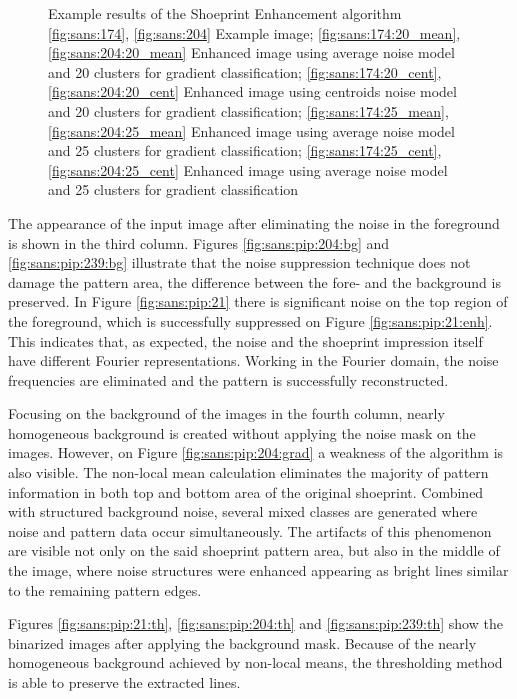 \documentclass[draft,final]{vutinfth} %
\begin{document}
{\begin{figure}[H]
\caption{Example results of the Shoeprint Enhancement algorithm
				\ref{fig:sans:174}, \ref{fig:sans:204} Example image; \ref{fig:sans:174:20_mean}, \ref{fig:sans:204:20_mean} Enhanced image using average noise model and 20 clusters for gradient classification; \ref{fig:sans:174:20_cent}, \ref{fig:sans:204:20_cent} Enhanced image using centroids noise model and 20 clusters for gradient classification; \ref{fig:sans:174:25_mean}, \ref{fig:sans:204:25_mean} Enhanced image using average noise model and 25 clusters for gradient classification; \ref{fig:sans:174:25_cent}, \ref{fig:sans:204:25_cent} Enhanced image using average noise model and 25 clusters for gradient classification}
\label{fig:sans:res2}

\end{figure}
}

\par
The appearance of the input image after eliminating the noise in the foreground is shown in the third column.
Figures  \ref{fig:sans:pip:204:bg} and \ref{fig:sans:pip:239:bg} illustrate that the noise suppression technique does not damage the pattern area, the difference between the fore- and the background is preserved.
In Figure \ref{fig:sans:pip:21} there is significant noise on the top region of the foreground, which is successfully suppressed on Figure \ref{fig:sans:pip:21:enh}.
This indicates that, as expected, the noise and the shoeprint impression itself have different Fourier representations.
Working in the Fourier domain, the noise frequencies are eliminated and the pattern is successfully reconstructed.
\par
Focusing on the background of the images in the fourth column, nearly homogeneous background is created without applying the noise mask on the images.
However, on Figure \ref{fig:sans:pip:204:grad} a weakness of the algorithm is also visible.
The non-local mean calculation eliminates the majority of pattern information in both top and bottom area of the original shoeprint.
Combined with structured background noise, several mixed classes are generated where noise and pattern data occur simultaneously.
The artifacts of this phenomenon are visible not only on the said shoeprint pattern area, but also in the middle of the image, where noise structures were enhanced appearing as bright lines similar to the remaining pattern edges.
\par
Figures \ref{fig:sans:pip:21:th}, \ref{fig:sans:pip:204:th} and \ref{fig:sans:pip:239:th} show the binarized images after applying the background mask.
Because of the nearly homogeneous background achieved by non-local means, the thresholding method is able to preserve the extracted lines.
\end{document}
